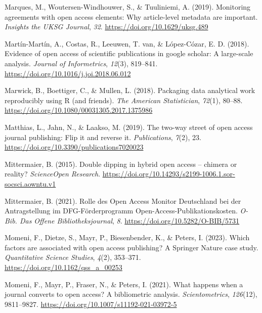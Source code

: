 \documentclass[a4paper,man,floatsintext,longtable,noextraspace,12pt]{apa6}
\newenvironment{CSLReferences}%
  {}%
  {\par}
\begin{document}
\begin{CSLReferences}{1}{0}
\leavevmode{}%
Marques, M., Woutersen-Windhouwer, S., \& Tuuliniemi, A. (2019).
Monitoring agreements with open access elements: Why article-level
metadata are important. \emph{Insights the {UKSG} Journal}, \emph{32}.
\url{https://doi.org/10.1629/uksg.489}

\leavevmode{}%
Martín-Martín, A., Costas, R., Leeuwen, T. van, \& López-Cózar, E. D.
(2018). Evidence of open access of scientific publications in google
scholar: A large-scale analysis. \emph{Journal of Informetrics},
\emph{12}(3), 819--841. \url{https://doi.org/10.1016/j.joi.2018.06.012}

\leavevmode{}%
Marwick, B., Boettiger, C., \& Mullen, L. (2018). Packaging data
analytical work reproducibly using {R} (and friends). \emph{The American
Statistician}, \emph{72}(1), 80--88.
\url{https://doi.org/10.1080/00031305.2017.1375986}

\leavevmode{}%
Matthias, L., Jahn, N., \& Laakso, M. (2019). The two-way street of open
access journal publishing: Flip it and reverse it. \emph{Publications},
\emph{7}(2), 23. \url{https://doi.org/10.3390/publications7020023}

\leavevmode{}%
Mittermaier, B. (2015). Double dipping in hybrid open access -- chimera
or reality? \emph{{ScienceOpen} Research}.
\url{https://doi.org/10.14293/s2199-1006.1.sor-socsci.aowntu.v1}

\leavevmode{}%
Mittermaier, B. (2021). {Rolle des Open Access Monitor Deutschland bei
der Antragstellung im DFG-Förderprogramm
Open-Access-Publikationskosten}. \emph{{O-Bib. Das Offene
Bibliotheksjournal}}, \emph{8}. \url{https://doi.org/10.5282/O-BIB/5731}

\leavevmode{}%
Momeni, F., Dietze, S., Mayr, P., Biesenbender, K., \& Peters, I.
(2023). Which factors are associated with open access publishing? A
{Springer Nature} case study. \emph{Quantitative Science Studies},
\emph{4}(2), 353--371. \url{https://doi.org/10.1162/qss_a_00253}

\leavevmode{}%
Momeni, F., Mayr, P., Fraser, N., \& Peters, I. (2021). What happens
when a journal converts to open access? A bibliometric analysis.
\emph{Scientometrics}, \emph{126}(12), 9811--9827.
\url{https://doi.org/10.1007/s11192-021-03972-5}


\end{CSLReferences}
\end{document}
